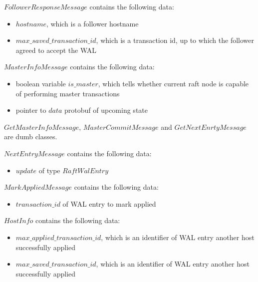 \documentclass{article}
\begin{document}
$FollowerResponseMessage$ contains the following data:
\begin{itemize}
	\item $hostname$, which is a follower hostname
	\item $max\_saved\_transaction\_id$, which is a transaction id, up to which the follower agreed to accept the WAL
\end{itemize}

$MasterInfoMessage$ contains the following data:
\begin{itemize}
	\item boolean variable $is\_master$, which tells whether current raft node is capable of performing master transactions
	\item pointer to $data$ protobuf of upcoming state
\end{itemize}

$GetMasterInfoMessage$, $MasterCommitMessage$ and $GetNextEnrtyMessage$ are dumb classes.

$NextEntryMessage$ contains the following data:
\begin{itemize}
	\item $update$ of type $RaftWalEntry$
\end{itemize}

$MarkAppliedMessage$ contains the following data:
\begin{itemize}
	\item $transaction\_id$ of WAL entry to mark applied
\end{itemize}

$HostInfo$ contains the following data:
\begin{itemize}
	\item $max\_applied\_transaction\_id$, which is an identifier of WAL entry another host successfully applied
	\item $max\_saved\_transaction\_id$, which is an identifier of WAL entry another host successfully applied
\end{itemize}
\end{document}
